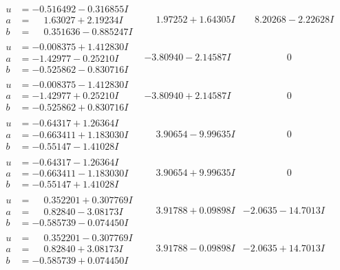 \documentclass[1p]{elsarticle_modified}
\theoremstyle{definition}
\begin{document}
$$\begin{array}{c|c|c}
\begin{aligned}
u &= -0.516492 - 0.316855 I \\
a &= \phantom{-}1.63027 + 2.19234 I \\
b &= \phantom{-}0.351636 - 0.885247 I\end{aligned}
 & \phantom{-}1.97252 + 1.64305 I & \phantom{-}8.20268 - 2.22628 I \\ \hline\begin{aligned}
u &= -0.008375 + 1.412830 I \\
a &= -1.42977 - 0.25210 I \\
b &= -0.525862 - 0.830716 I\end{aligned}
 & -3.80940 - 2.14587 I & \phantom{-0.000000 } 0 \\ \hline\begin{aligned}
u &= -0.008375 - 1.412830 I \\
a &= -1.42977 + 0.25210 I \\
b &= -0.525862 + 0.830716 I\end{aligned}
 & -3.80940 + 2.14587 I & \phantom{-0.000000 } 0 \\ \hline\begin{aligned}
u &= -0.64317 + 1.26364 I \\
a &= -0.663411 + 1.183030 I \\
b &= -0.55147 - 1.41028 I\end{aligned}
 & \phantom{-}3.90654 - 9.99635 I & \phantom{-0.000000 } 0 \\ \hline\begin{aligned}
u &= -0.64317 - 1.26364 I \\
a &= -0.663411 - 1.183030 I \\
b &= -0.55147 + 1.41028 I\end{aligned}
 & \phantom{-}3.90654 + 9.99635 I & \phantom{-0.000000 } 0 \\ \hline\begin{aligned}
u &= \phantom{-}0.352201 + 0.307769 I \\
a &= \phantom{-}0.82840 - 3.08173 I \\
b &= -0.585739 - 0.074450 I\end{aligned}
 & \phantom{-}3.91788 + 0.09898 I & -2.0635 - 14.7013 I \\ \hline\begin{aligned}
u &= \phantom{-}0.352201 - 0.307769 I \\
a &= \phantom{-}0.82840 + 3.08173 I \\
b &= -0.585739 + 0.074450 I\end{aligned}
 & \phantom{-}3.91788 - 0.09898 I & -2.0635 + 14.7013 I \\ \hline\begin{aligned}

\end{aligned}
\end{array}$$
\end{document}
